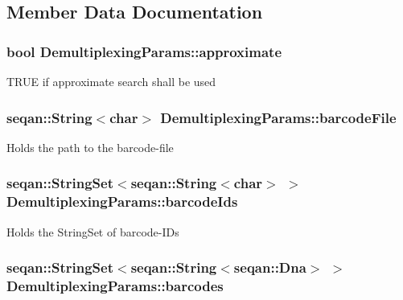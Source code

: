 \subsection{Member Data Documentation}
\hypertarget{struct_demultiplexing_params_ae76872bea7b75ea020035f7825fc8210}{
\subsubsection[{approximate}]{\setlength{\rightskip}{0pt plus 5cm}bool Demultiplexing\-Params\-::approximate}}\label{struct_demultiplexing_params_ae76872bea7b75ea020035f7825fc8210}
T\-R\-U\-E if approximate search shall be used \hypertarget{struct_demultiplexing_params_a2b2b682fbf21f3ca8daafe3e9b83c0ca}{
\subsubsection[{barcode\-File}]{\setlength{\rightskip}{0pt plus 5cm}seqan\-::\-String$<$char$>$ Demultiplexing\-Params\-::barcode\-File}}\label{struct_demultiplexing_params_a2b2b682fbf21f3ca8daafe3e9b83c0ca}
Holds the path to the barcode-\/file \hypertarget{struct_demultiplexing_params_a1721fa9ad83112b0d2df9c2932bd00be}{
\subsubsection[{barcode\-Ids}]{\setlength{\rightskip}{0pt plus 5cm}seqan\-::\-String\-Set$<$seqan\-::\-String$<$char$>$ $>$ Demultiplexing\-Params\-::barcode\-Ids}}\label{struct_demultiplexing_params_a1721fa9ad83112b0d2df9c2932bd00be}
Holds the String\-Set of barcode-\/\-I\-Ds \hypertarget{struct_demultiplexing_params_aaeea114c00f19f6565047e507a74f90f}{
\subsubsection[{barcodes}]{\setlength{\rightskip}{0pt plus 5cm}seqan\-::\-String\-Set$<$seqan\-::\-String$<$seqan\-::\-Dna$>$ $>$ Demultiplexing\-Params\-::barcodes}}\label{struct_demultiplexing_params_aaeea114c00f19f6565047e507a74f90f}
